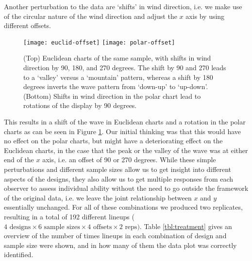 Another perturbation to the data are `shifts' in wind direction, i.e. we make use of the circular nature of the wind direction and adjust the $x$ axis by using different offsets.

\begin{figure}[htbp] %
   \centering
   \texttt{[image: euclid-offset]} 
   \texttt{[image: polar-offset]} 
   \caption{ \label{fig:offset} (Top) Euclidean charts of the same sample, with shifts in wind direction by 90, 180, and 270 degrees. The shift by 90 and 270 leads to a `valley' versus a `mountain' pattern, whereas a shift by 180 degrees inverts the wave pattern from `down-up' to `up-down'. %
      (Bottom) Shifts in wind direction in the polar chart lead to rotations of the display by 90 degrees.}
\end{figure}

 This results in a shift of the wave in Euclidean charts and a rotation in the polar charts as can be seen in Figure \ref{fig:offset}. Our initial thinking was that this would have no effect on the polar charts, but might have a deteriorating effect on the Euclidean charts, in the case that the peak or the valley of the wave was at either end of the $x$ axis, i.e. an offset of 90 or 270 degrees. 
While these simple perturbations and different sample sizes allow us to get insight into different aspects of the designs, they also allow us to get multiple responses from each observer to assess individual ability without the need to go outside the framework of the original data, i.e. we leave the joint relationship between $x$ and $y$ essentially unchanged. For all of these combinations we produced two replicates, resulting in a total of 192 different lineups ($ 4 \text{ designs} \times 6 \text{ sample sizes} \times 4 \text{ offsets} \times 2 \text{ reps})$.
Table \ref{tbl:treatment} gives an overview of the number of times lineups in each combination of design and sample size were shown, and in how many of them the data plot was correctly identified. 


